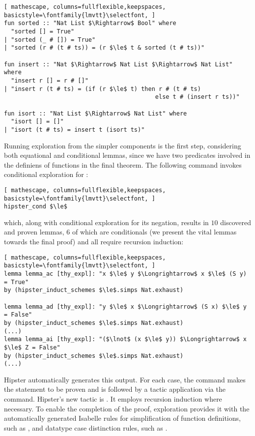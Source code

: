 \begin{lstlisting}[ mathescape, columns=fullflexible,keepspaces, basicstyle=\fontfamily{lmvtt}\selectfont, ]
fun sorted :: "Nat List $\Rightarrow$ Bool" where
  "sorted [] = True"
| "sorted (_ # []) = True"
| "sorted (r # (t # ts)) = (r $\le$ t & sorted (t # ts))"

fun insert :: "Nat $\Rightarrow$ Nat List $\Rightarrow$ Nat List" where
  "insert r [] = r # []"
| "insert r (t # ts) = (if (r $\le$ t) then r # (t # ts)	
                                           else t # (insert r ts))"

fun isort :: "Nat List $\Rightarrow$ Nat List" where
  "isort [] = []"
| "isort (t # ts) = insert t (isort ts)"
\end{lstlisting}

Running exploration from the simpler components is the first step, considering both equational and conditional lemmas, since we have two predicates involved in the definiens of functions in the final theorem.
%
The following command invokes conditional exploration for \isaCode{$\le$}:

\begin{lstlisting}[ mathescape, columns=fullflexible,keepspaces, basicstyle=\fontfamily{lmvtt}\selectfont, ]
hipster_cond $\le$
\end{lstlisting}

\noindent which, along with conditional exploration for its negation, results in $10$ discovered and proven lemmas, $6$ of which are conditionals (we present the vital lemmas towards the final proof) and all require recursion induction:

\begin{lstlisting}[ mathescape, columns=fullflexible,keepspaces, basicstyle=\fontfamily{lmvtt}\selectfont, ]
lemma lemma_ac [thy_expl]: "x $\le$ y $\Longrightarrow$ x $\le$ (S y) = True"
by (hipster_induct_schemes $\le$.simps Nat.exhaust)

lemma lemma_ad [thy_expl]: "y $\le$ x $\Longrightarrow$ (S x) $\le$ y = False"
by (hipster_induct_schemes $\le$.simps Nat.exhaust)
(...)
lemma lemma_ai [thy_expl]: "($\lnot$ (x $\le$ y)) $\Longrightarrow$ x $\le$ Z = False"
by (hipster_induct_schemes $\le$.simps Nat.exhaust)
(...)
\end{lstlisting}

\noindent Hipster automatically generates this output.
%
For each case, the  command makes the statement to be proven and is followed by a tactic application via the  command.
%
Hipster's new tactic is .
%
It employs recursion induction where necessary.
%
To enable the completion of the proof, exploration provides it with the automatically generated Isabelle rules for simplification of function definitions, such as , and datatype case distinction rules, such as .

